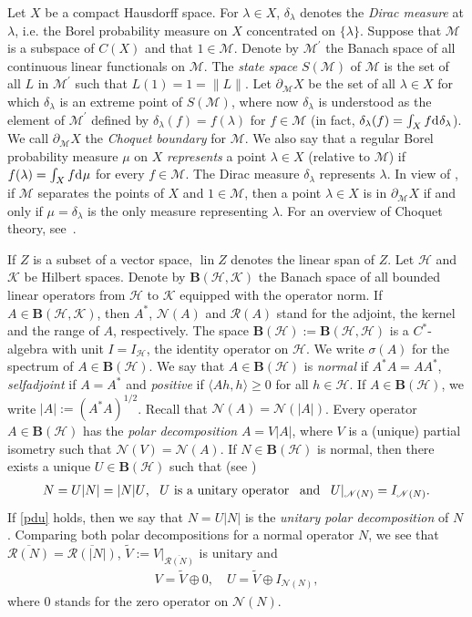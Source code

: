 \documentclass[reqno]{amsproc}
\DeclareMathOperator{\lin}{lin}
\numberwithin{equation}{section}
\theoremstyle{remark}
\newcommand*{\hh}{\mathcal{H}}
\newcommand*{\kk}{\mathcal{K}}
\newcommand*{\mcal}{\mathcal{M}}
\newcommand*{\nul}{\mathscr{N}}
\newcommand*{\D}{\mathrm{d\hspace{.1ex}}}
\theoremstyle{definition}
\newcommand*{\Ge}{\geqslant}
\newcommand*{\ran}{\mathscr{R}}
\newcommand*{\ogr}{\boldsymbol{B}}
\begin{document}
Let $X$ be a compact Hausdorff space. For $\lambda \in
X$, $\delta_{\lambda}$ denotes the {\em Dirac measure}
at $\lambda$, i.e. the Borel probability measure on
$X$ concentrated on $\{\lambda\}$. Suppose that
$\mathcal{M}$ is a subspace of $C(X)$ and that $1\in
\mathcal{M}$. Denote by $\mathcal{M}^{\prime}$ the
Banach space of all continuous linear functionals on
$\mathcal{M}$. The \textit{state space}
$S(\mathcal{M})$ of $\mathcal{M}$ is the set of all
$L$ in $\mathcal{M}^{\prime}$ such that $L(1) = 1 =
\|L\|$. Let $\partial_\mathcal{M}X$ be the set of all
$\lambda\in X$ for which $\delta_{\lambda}$ is an
extreme point of $S(\mathcal{M})$, where now
$\delta_{\lambda}$ is understood as the element of
$\mathcal{M}^{\prime}$ defined by
$\delta_{\lambda}(f)=f(\lambda)$ for $f\in
\mathcal{M}$ (in fact, $\delta_{\lambda}(f)=\int_X f
\D \delta_{\lambda}$). We call $\partial_\mathcal{M}X$
the \textit{Choquet boundary} for $\mathcal{M}$. We
also say that a regular Borel probability measure
$\mu$ on $X$ {\em represents} a point $\lambda\in X$
(relative to $\mcal$) if $f(\lambda)=\int_X f \D \mu$
for every $f\in \mcal$. The Dirac measure
$\delta_{\lambda}$ represents $\lambda$. In view of
\cite[Proposition~6.2]{Phe02}, if $\mcal$ separates
the points of $X$ and $1\in \mathcal{M}$, then a point
$\lambda\in X$ is in $\partial_{\mcal}X$ if and only
if $\mu=\delta_{\lambda}$ is the only measure
representing $\lambda$. For an overview of Choquet
theory, see~\cite{Phe02}.

If $Z$ is a subset of a vector space, $\lin Z$ denotes
the linear span of $Z$. Let $\hh$ and $\kk$ be Hilbert
spaces. Denote by $\ogr(\hh, \kk)$ the Banach space of
all bounded linear operators from $\hh$ to $\kk$
equipped with the operator norm. If $A\in
\ogr(\hh,\kk)$, then $A^*$, $\nul(A)$ and $\ran(A)$
stand for the adjoint, the kernel and the range of
$A$, respectively. The space
$\ogr(\hh):=\ogr(\hh,\hh)$ is a $C^*$-algebra with
unit $I=I_{\hh}$, the identity operator on $\hh$. We
write $\sigma(A)$ for the spectrum of $A \in
\ogr(\hh)$. We say that $A\in \ogr(\hh)$ is
\textit{normal} if $A^*A=AA^*$, \textit{selfadjoint}
if $A=A^*$ and \textit{positive} if $\langle
Ah,h\rangle \Ge 0$ for all $h\in \hh$. If $A\in
\ogr(\hh)$, we write $|A|:=(A^*A)^{1/2}$. Recall that
$\nul(A)=\nul(|A|)$. Every operator $A\in \ogr(\hh)$
has the {\em polar decomposition} $A=V|A|$, where $V$
is a (unique) partial isometry such that
$\nul(V)=\nul(A)$. If $N \in \ogr(\hh)$ is normal,
then there exists a unique $U\in \ogr(\hh)$ such that
(see \cite[Theorem~6, p.\ ~66]{Fur01})
   \begin{align} \label{pdu}
\text{$N=U |N|=|N|U$, \, $U$ is a unitary operator \,
and \, $U|_{\nul(N)}=I_{\nul(N)}$.}
   \end{align}
If \eqref{pdu} holds, then we say that $N=U |N|$ is
the \textit{unitary polar decomposition} of $N$.
Comparing both polar decompositions for a normal
operator $N$, we see that
$\overline{\ran(N)}=\overline{\ran(|N|)}$, $\tilde
V:=V|_{\overline{\ran(N)}}$ is unitary and
   \begin{align} \label{orotrh}
V=\tilde V \oplus 0, \quad U=\tilde V \oplus
I_{\nul(N)},
   \end{align}
where $0$ stands for the zero operator on $\nul(N)$.
\end{document}

